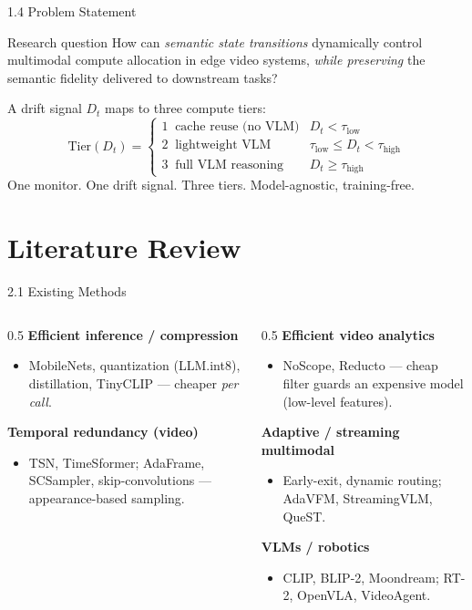 \documentclass[11pt,aspectratio=169]{beamer}
\begin{document}
\begin{frame}{1.4 Problem Statement}
\begin{block}{Research question}
How can \emph{semantic state transitions} dynamically control multimodal compute allocation in edge video systems, \emph{while preserving} the semantic fidelity delivered to downstream tasks?
\end{block}
\vspace{1mm}
A drift signal $D_t$ maps to three compute tiers:
\[
\text{Tier}(D_t)=
\begin{cases}
1 \;\; \text{cache reuse (no VLM)} & D_t < \tau_{\text{low}}\\
2 \;\; \text{lightweight VLM} & \tau_{\text{low}}\le D_t<\tau_{\text{high}}\\
3 \;\; \text{full VLM reasoning} & D_t \ge \tau_{\text{high}}
\end{cases}
\]
\centering\alert{One monitor. One drift signal. Three tiers. Model-agnostic, training-free.}
\end{frame}

\section{Literature Review}

\begin{frame}{2.1 Existing Methods}
\begin{columns}[T]
\begin{column}{0.5\textwidth}
\textbf{Efficient inference / compression}
\begin{itemize}\footnotesize
  \item MobileNets, quantization (LLM.int8), distillation, TinyCLIP --- cheaper \emph{per call}.
\end{itemize}
\textbf{Temporal redundancy (video)}
\begin{itemize}\footnotesize
  \item TSN, TimeSformer; AdaFrame, SCSampler, skip-convolutions --- appearance-based sampling.
\end{itemize}
\end{column}
\begin{column}{0.5\textwidth}
\textbf{Efficient video analytics}
\begin{itemize}\footnotesize
  \item NoScope, Reducto --- cheap filter guards an expensive model (low-level features).
\end{itemize}
\textbf{Adaptive / streaming multimodal}
\begin{itemize}\footnotesize
  \item Early-exit, dynamic routing; AdaVFM, StreamingVLM, QueST.
\end{itemize}
\textbf{VLMs / robotics}
\begin{itemize}\footnotesize
  \item CLIP, BLIP-2, Moondream; RT-2, OpenVLA, VideoAgent.
\end{itemize}
\end{column}
\end{columns}
\end{frame}
\end{document}

